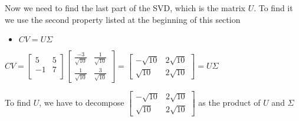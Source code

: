 Now we need to find the last part of the SVD, which is the matrix $ U $. To find it we use the second property listed at the beginning of this section\\
\begin{itemize}
	\item $CV=U\Sigma$
\end{itemize}
\begin{center}
	$ CV=\begin{bmatrix}
		5 &   5 \\
		-1  &  7 \\
	\end{bmatrix}\begin{bmatrix}
	\frac{-3}{\sqrt{10}} & \frac{1}{\sqrt{10}}\\
	\frac{1}{\sqrt{10}} &	\frac{3}{\sqrt{10}}
	\end{bmatrix}=\begin{bmatrix}
	-\sqrt{10} & 2\sqrt{10}\\
	\sqrt{10} &	2\sqrt{10}
	\end{bmatrix}=U\Sigma $
\end{center}
To find $U$, we have to decompose $\begin{bmatrix}
-\sqrt{10} & 2\sqrt{10}\\
\sqrt{10} &	2\sqrt{10}
\end{bmatrix}$ as the product of $U$ and $\Sigma$
